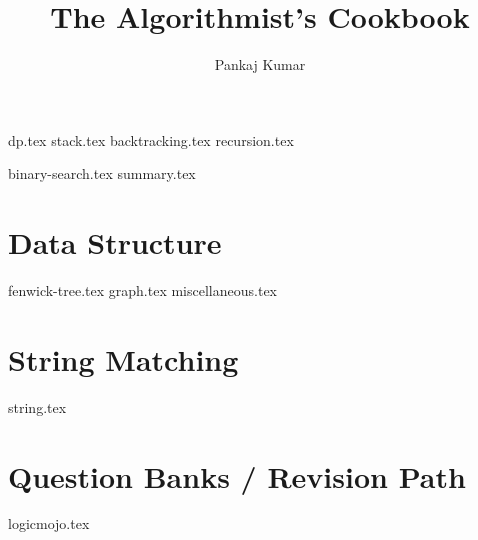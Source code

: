\documentclass{../latex-setting/cmemoir}
\title{The Algorithmist's Cookbook}
\author{Pankaj Kumar}
\begin{document}
\maketitle

\frontmatter

\tableofcontents

\restoregeometry%

\mainmatter{}


{dp.tex}
{stack.tex}
{backtracking.tex}
{recursion.tex}

{binary-search.tex}
{summary.tex}



\part{Data Structure}
{fenwick-tree.tex}
{graph.tex}
{miscellaneous.tex}



\part{String Matching}
{string.tex}

\part{ Question Banks / Revision Path}
{logicmojo.tex}
% 
\end{document}
